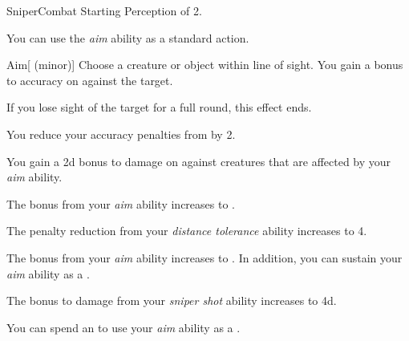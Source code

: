     \begin{feat}{Sniper}{Combat}
        \featpre Starting Perception of 2.

         You can use the \textit{aim} ability as a standard action.
        \begin{freeability}{Aim}[ (minor)]
            Choose a creature or object within line of sight.
            You gain a  bonus to accuracy on  against the target.

            If you lose sight of the target for a full round, this effect ends.
        \end{freeability}

         You reduce your accuracy penalties from  by 2.

         You gain a \plus2d bonus to damage on  against \unaware creatures that are affected by your \textit{aim} ability.

         The bonus from your \textit{aim} ability increases to .

         The penalty reduction from your \textit{distance tolerance} ability increases to 4.

         The bonus from your \textit{aim} ability increases to .
        In addition, you can sustain your \textit{aim} ability as a .

         The bonus to damage from your \textit{sniper shot} ability increases to \plus4d.

         You can spend an  to use your \textit{aim} ability as a .
    \end{feat}

